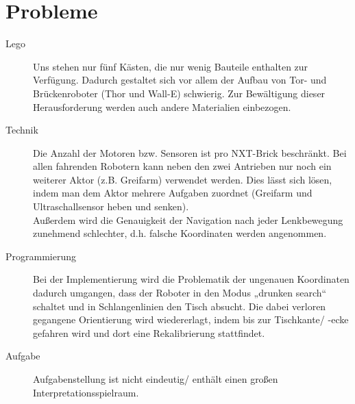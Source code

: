 \documentclass[a4paper]{scrartcl}
\begin{document}
	\section{Probleme}
	\begin{description}
		\item[Lego] Uns stehen nur fünf Kästen, die nur wenig Bauteile enthalten zur Verfügung. Dadurch gestaltet sich vor allem der Aufbau von Tor- und Brückenroboter (Thor und Wall-E) schwierig. Zur Bewältigung dieser Herausforderung werden auch andere Materialien einbezogen.
		\item[Technik] Die Anzahl der Motoren bzw. Sensoren ist pro NXT-Brick beschränkt. Bei allen fahrenden Robotern kann neben den zwei Antrieben nur noch ein weiterer Aktor (z.B. Greifarm) verwendet werden. Dies lässt sich lösen, indem man dem Aktor mehrere Aufgaben zuordnet (Greifarm und Ultraschallsensor heben und senken). \\
			Außerdem wird die Genauigkeit der Navigation nach jeder Lenkbewegung zunehmend schlechter, d.h. falsche Koordinaten werden angenommen.
		\item[Programmierung] Bei der Implementierung wird die Problematik der ungenauen Koordinaten dadurch umgangen, dass der Roboter in den Modus „drunken search“ schaltet und in Schlangenlinien den Tisch absucht. Die dabei verloren gegangene Orientierung wird wiedererlagt, indem bis zur Tischkante/ -ecke gefahren wird und dort eine Rekalibrierung stattfindet.
		\item[Aufgabe] Aufgabenstellung ist nicht eindeutig/ enthält einen großen Interpretationsspielraum. 
	\end{description}
\end{document}
